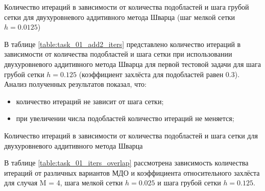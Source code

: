 \documentclass[a4paper]{article}
\begin{document}
\newpage

\begin{table}[h]
\caption{Количество итераций в зависимости от количества подобластей и шага грубой сетки для двухуровневого аддитивного метода Шварца (шаг мелкой сетки $h = 0.0125$)}
\label{table:task_01_add2_coarse}
\end{table}

В таблице \ref{table:task_01_add2_iters} представлено количество итераций в зависимости от количества подобластей и шага сетки при использовании двухуровневого аддитивного метода Шварца для первой тестовой задачи для шага грубой сетки $h = 0.125$ (коэффициент захлёста для подобластей равен 0.3). Анализ полученных результатов показал, что:
\begin{itemize}
\item количество итераций не зависит от шага сетки;
\item при увеличении числа подобластей количество итераций не меняется;
\end{itemize}

\begin{table}[h]
\caption{Количество итераций в зависимости от количества подобластей и шага сетки для двухуровневого аддитивного метода Шварца}
\label{table:task_01_add2_iters}
\end{table}

В таблице \ref{table:task_01_iters_overlap} рассмотрена зависимость количества итераций от различных вариантов МДО и коэффициента относительного захлёста для случая M = 4, шага мелкой сетки $h = 0.025$ и шага грубой сетки $h = 0.125$. 
\end{document}
